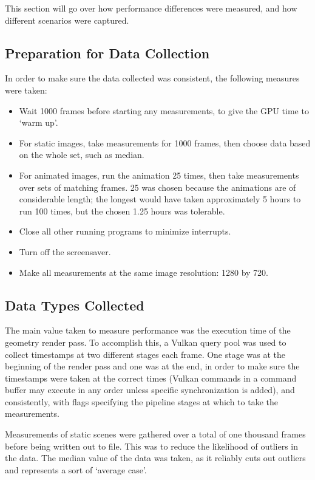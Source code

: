 This section will go over how performance differences were measured, and how different scenarios were captured.

\subsection{Preparation for Data Collection}

In order to make sure the data collected was consistent, the following measures were taken:

\begin{itemize}
	\item Wait 1000 frames before starting any measurements, to give the GPU time to `warm up'.
	\item For static images, take measurements for 1000 frames, then choose data based on the whole set, such as median.
	\item For animated images, run the animation 25 times, then take measurements over sets of matching frames. 25 was chosen because the animations are of considerable length; the longest would have taken approximately 5 hours to run 100 times, but the chosen 1.25 hours was tolerable.
	\item Close all other running programs to minimize interrupts.
	\item Turn off the screensaver.
	\item Make all measurements at the same image resolution: 1280 by 720.
\end{itemize}

\subsection{Data Types Collected}

The main value taken to measure performance was the execution time of the geometry render pass. To accomplish this, a Vulkan query pool was used to collect timestamps at two different stages each frame. One stage was at the beginning of the render pass and one was at the end, in order to make sure the timestamps were taken at the correct times (Vulkan commands in a command buffer may execute in any order unless specific synchronization is added), and consistently, with flags specifying the pipeline stages at which to take the measurements.\newline

Measurements of static scenes were gathered over a total of one thousand frames before being written out to file. This was to reduce the likelihood of outliers in the data. The median value of the data was taken, as it reliably cuts out outliers and represents a sort of `average case'.\newline

